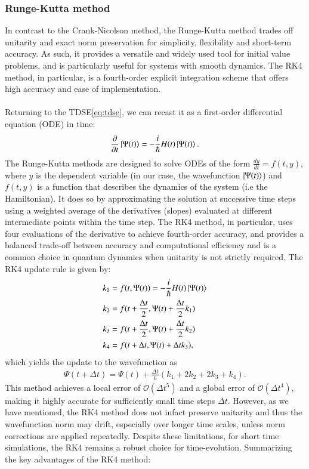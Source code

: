 \documentclass{subfiles}
\begin{document}
\subsubsection{Runge-Kutta method}
In contrast to the Crank-Nicolson method, the Runge-Kutta method trades off unitarity and exact norm preservation for simplicity, flexibility and short-term accuracy. As such, it provides a versatile and widely used tool for initial value problems, and is particularly useful for systems with smooth dynamics. The RK4 method, in particular, is a fourth-order explicit integration scheme that offers high accuracy and ease of implementation.
\\\\
Returning to the TDSE\eqref{eq:tdse}, we can recast it as a first-order differential equation (ODE) in time:
\begin{align*}
    \frac{\partial}{\partial t}\ket{\Psi(t)} = -\frac{i}{\hbar}H(t)\ket{\Psi(t)}.
\end{align*}
The Runge-Kutta methods are designed to solve ODEs of the form $\frac{dy}{dt} = f(t, y)$, where $y$ is the dependent variable (in our case, the wavefunction $\ket{\Psi(t)}$) and $f(t, y)$ is a function that describes the dynamics of the system (i.e the Hamiltonian). It does so by approximating the solution at successive time steps using a weighted average of the derivatives (slopes) evaluated at different intermediate points within the time step. The RK4 method, in particular, uses four evaluations of the derivative to achieve fourth-order accuracy, and provides a balanced trade-off between accuracy and computational efficiency and is a common choice in quantum dynamics when unitarity is not strictly required. The RK4 update rule is given by:
\begin{align*}
    k_1 &= f(t, \Psi(t)) = -\frac{i}{\hbar}H(t)\ket{\Psi(t)} \\
    k_2 &= f(t + \frac{\Delta t}{2}, \Psi(t) + \frac{\Delta t}{2}k_1) \\
    k_3 &= f(t + \frac{\Delta t}{2}, \Psi(t) + \frac{\Delta t}{2}k_2) \\
    k_4 &= f(t + \Delta t, \Psi(t) + \Delta t k_3),
\end{align*}
which yields the update to the wavefunction as
\begin{align*}
    \Psi(t + \Delta t) = \Psi(t) + \frac{\Delta t}{6}(k_1 + 2k_2 + 2k_3 + k_4).
\end{align*}
This method achieves a local error of $\mathcal{O}(\Delta t^5)$ and a global error of $\mathcal{O}(\Delta t^4)$, making it highly accurate for sufficiently small time steps $\Delta t$. However, as we have mentioned, the RK4 method does not infact preserve unitarity and thus the wavefunction norm may drift, especially over longer time scales, unless norm corrections are applied repeatedly. Despite these limitations, for short time simulations, the RK4 remains a robust choice for time-evolution. Summarizing the key advantages of the RK4 method:
\end{document}
